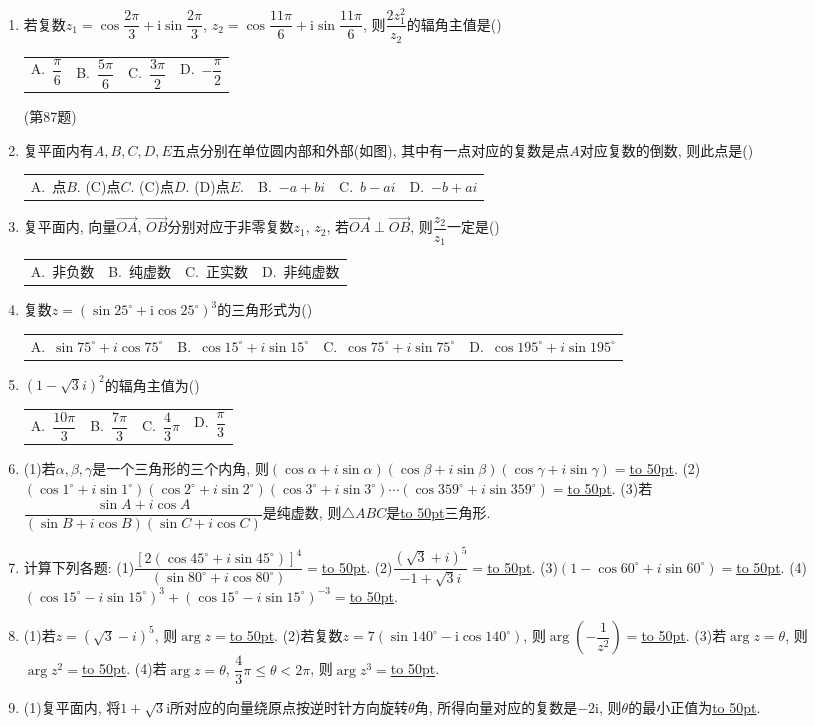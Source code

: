 \documentclass[10pt,a4paper]{article}
\newcommand{\blank}[1]{\underline{\hbox to #1pt{}}}
\newcommand{\fourch}[4]{\par\begin{tabular}{p{.23\textwidth}p{.23\textwidth}p{.23\textwidth}p{.23\textwidth}}
A.~#1 &B.~#2& C.~#3& D.~#4
\end{tabular}}
\begin{document}
\begin{enumerate}[1.]
(二)复数三角形式的运算
\item 若复数$z_1=\cos \dfrac{2\pi }3+\mathrm{i}\sin \dfrac{2\pi }3$, $z_2=\cos \dfrac{11\pi }6+\mathrm{i}\sin \dfrac{11\pi }6$, 则$\dfrac{2z_1^2}{z_2}$的辐角主值是()
\fourch{$\dfrac{\pi }6$}{$\dfrac{5\pi }6$}{$\dfrac{3\pi }2$}{$-\dfrac{\pi }2$}
(第87题)
\item 复平面内有$A,B,C,D,E$五点分别在单位圆内部和外部(如图), 其中有一点对应的复数是点$A$对应复数的倒数, 则此点是()
\fourch{点$B$.		(C)点$C$.			(C)点$D$.			(D)点$E$.
\item 把复数$a+b\mathrm{i}$($a,b\in R$)在复平间内的对应向量绕原点$O$顺时针方向旋转90°后, 所得向量对应的复数为()
(A)$a-bi$}{$-a+bi$}{$b-ai$}{$-b+ai$}
\item 复平面内, 向量$\overrightarrow{OA}$, $\overrightarrow{OB}$分别对应于非零复数$z_1$, $z_2$, 若$\overrightarrow{OA}\perp \overrightarrow{OB}$, 则$\dfrac{z_2}{z_1}$一定是()
\fourch{非负数}{纯虚数}{正实数}{非纯虚数}
\item 复数$z=(\sin 25^\circ +\mathrm{i}\cos 25^\circ)^3$的三角形式为()
\fourch{$\sin 75^\circ +i\cos 75^\circ$}{$\cos 15^\circ +i\sin 15^\circ$}{$\cos 75^\circ +i\sin 75^\circ$}{$\cos 195^\circ +i\sin 195^\circ$}
\item $(1-\sqrt 3i)^2$的辐角主值为()
\fourch{$\dfrac{10\pi }3$}{$\dfrac{7\pi }3$}{$\dfrac 43\pi$}{$\dfrac{\pi }3$}
\item (1)若$\alpha ,\beta ,\gamma$是一个三角形的三个内角, 则$(\cos \alpha +i\sin \alpha)(\cos \beta +i\sin \beta)(\cos \gamma +i\sin \gamma)=$\blank{50}.
(2)$(\cos 1^\circ +i\sin 1^\circ)(\cos 2^\circ +i\sin 2^\circ)(\cos 3^\circ +i\sin 3^\circ)\cdots (\cos 359^\circ +i\sin 359^\circ)=$\blank{50}.
(3)若$\dfrac{\sin A+i\cos A}{(\sin B+i\cos B)(\sin C+i\cos C)}$是纯虚数, 则$\triangle ABC$是\blank{50}三角形.
\item 计算下列各题:
(1)$\dfrac{{{[2(\cos 45^\circ +i\sin 45^\circ)]}^4}}{(\sin 80^\circ +i\cos 80^\circ)}=$\blank{50}.
(2)$\dfrac{{{(\sqrt 3+i)}^5}}{-1+\sqrt 3i}=$\blank{50}.
(3)$(1-\cos 60^{\circ }+i\sin 60^{\circ })=$\blank{50}.
(4)$(\cos 15^\circ -i\sin 15^\circ)^3+(\cos 15^\circ -i\sin 15^\circ)^{-3}=$\blank{50}.
\item (1)若$z=(\sqrt 3-i)^5$, 则$\arg z=$\blank{50}.
(2)若复数$z=7(\sin 140^\circ -\mathrm{i}\cos 140^\circ)$, 则$\arg (-\dfrac 1{z^2})=$\blank{50}.
(3)若$\arg z=\theta$, 则$\arg z^2=$\blank{50}.
(4)若$\arg z=\theta$, $\dfrac 43\pi \le \theta <2\pi$, 则$\arg z^3=$\blank{50}.
\item (1)复平面内, 将$1+\sqrt 3\mathrm{i}$所对应的向量绕原点按逆时针方向旋转$\theta$角, 所得向量对应的复数是$-2\mathrm{i}$, 则$\theta$的最小正值为\blank{50}.

\end{enumerate}
\end{document}
